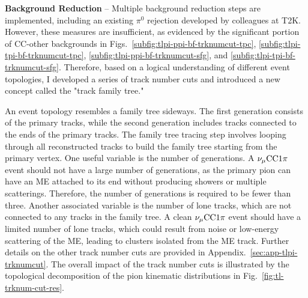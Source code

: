           \textbf{Background Reduction} – Multiple background reduction steps are implemented, including an existing $\pi^0$ rejection developed by colleagues at T2K. 
          However, these measures are insufficient, as evidenced by the significant portion of CC-other backgrounds in Figs.~\ref{subfig:tlpi-ppi-bf-trknumcut-tpc}, \ref{subfig:tlpi-tpi-bf-trknumcut-tpc}, \ref{subfig:tlpi-ppi-bf-trknumcut-sfg}, and \ref{subfig:tlpi-tpi-bf-trknumcut-sfg}. 
          Therefore, based on a logical understanding of different event topologies, I developed a series of track number cuts and introduced a new concept called the "track family tree."

          An event topology resembles a family tree sideways. 
          The first generation consists of the primary tracks, while the second generation includes tracks connected to the ends of the primary tracks. 
          The family tree tracing step involves looping through all reconstructed tracks to build the family tree starting from the primary vertex. 
          One useful variable is the number of generations. 
          A $\nu_{\mu}\textrm{CC}1\pi$ event should not have a large number of generations, as the primary pion can have an ME attached to its end without producing showers or multiple scatterings. 
          Therefore, the number of generations is required to be fewer than three. 
          Another associated variable is the number of lone tracks, which are not connected to any tracks in the family tree. 
          A clean $\nu_{\mu}\textrm{CC}1\pi$ event should have a limited number of lone tracks, which could result from noise or low-energy scattering of the ME, leading to clusters isolated from the ME track. 
          Further details on the other track number cuts are provided in Appendix.~\ref{sec:app-tlpi-trknumcut}. 
          The overall impact of the track number cuts is illustrated by the topological decomposition of the pion kinematic distributions in Fig.~\ref{fig:tl-trknum-cut-res}.

